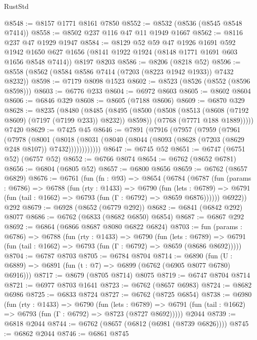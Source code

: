 \begin{lexlean}{RustStd}
\begin{coremodule}
{\begin{coremodule}
{{{{{{{{{{{{{{{{{{{{{{{{{{{{{{{{{{{{{{{{{{{{@8548 := @8157 @1771 @8161 @7850
@8552 := @8532 (@8536 (@8545 @8548 @7414))
@8558 := @8502 @237 @116 @47 @11 @1949 @1667
@8562 := @8116 @237 @47 @1929 @1947
@8584 := @8129
    @52
    @59
    @47
    @1926
    @1691
    @592
    @1942
    @1650
    @627
    @1656
    (@8141 @1922 @1924 (@8148 @1771 @1691 @603 @1656 @8548 @7414))
    @8197
    @8203
@8586 := @8206 (@8218 @52)
@8596 := @8558 (@8562 (@8584 @8586 @7414 (@7203 (@8223 @1942 @1933)) @7432 @8232))
@8598 := @7179 @8098 @1523
@8602 := @8523 (@8526 (@8552 (@8596 @8598)))
@8603 := @6776 @233
@8604 := @6972 @8603
@8605 := @8602 @8604
@8606 := @6846 @329
@8608 := @8605 (@7188 @8606)
@8609 := @6870 @329
@8628 := @8235
    (@8480
      (@8485
        (@8495
          (@8500 (@8508 (@8513 (@8608 (@7192 @8609) (@7197 (@7199 @233)) @8232)) @8598))
          (@7768 (@7771 @188 @1889)))))
    @7420
@8629 := @7425 @45
@8646 := @7891
    (@7916
      (@7957
        (@7959
          (@7961
            (@7978
              (@8001
                (@8018
                  (@8031 (@8040 (@8044 (@8093 (@8628 (@7203 (@8629 @248 @8107)) @7432))))))))))))
@8647 := @6745 @52
@8651 := @6747 (@6751 @52) (@6757 @52)
@8652 := @6766 @8074
@8654 := @6762 (@8652 @6781)
@8656 := @6804 (@6805 @52)
@8657 := @6800 @8656
@8659 := @6762 (@8657 @6829)
@8676 := @6761
    (fun (fn : @93) =>
    @8654
      (@6784
        (@6787
          (fun (params : @6786) =>
          @6788
            (fun (rty : @1433) =>
            @6790
              (fun (lets : @6789) =>
              @6791 (fun (tail : @1662) => @6793 (fun (Γ : @6792) => @8659 @6876))))))
        @6922))
    @292
@8679 := @6928 (@8652 (@6779 @292))
@8682 := @6841 (@6842 @292) @8077
@8686 := @6762 (@6833 (@8682 @6850) @6854)
@8687 := @6867 @292
@8692 := @6864 (@6866 @8687 @8080 @6822 @6824)
@8703 := fun (params : @6786) =>
  @6788
    (fun (rty : @1433) =>
    @6790
      (fun (lets : @6789) =>
      @6791 (fun (tail : @1662) => @6793 (fun (Γ : @6792) => @8659 (@8686 @8692)))))
@8704 := @6787 @8703
@8705 := @6784 @8704
@8714 := @6890 (fun (U : @6889) => @6891 (fun (t : @7) => @6899 (@6762 (@6905 @8077 @6780) @6916)))
@8717 := @8679 (@8705 @8714) @8075
@8719 := @6747 @8704 @8714
@8721 := @6977 @8703 @1641
@8723 := @6762 (@8657 @6983)
@8724 := @8682 @6986
@8725 := @6833 @8724
@8727 := @6762 (@8725 @6854)
@8738 := @6980
    (fun (rty : @1433) =>
    @6790
      (fun (lets : @6789) =>
      @6791 (fun (tail : @1662) => @6793 (fun (Γ : @6792) => @8723 (@8727 @8692)))))
    @2044
@8739 := @6818 @2044
@8744 := @6762 (@8657 (@6812 (@6981 (@8739 @6826))))
@8745 := @6862 @2044
@8746 := @6861 @8745
}}}}}}}}}}}}}}}}}}}}}}}}}}}}}}}}}}}}}}}}}}}}
\end{coremodule}}
\end{coremodule}
\end{lexlean}
